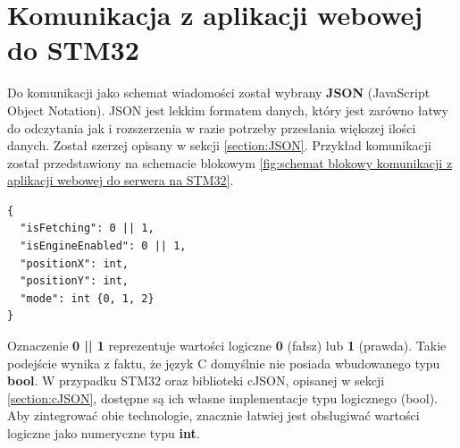 \section{Komunikacja z aplikacji webowej do STM32}
Do komunikacji jako schemat wiadomości został wybrany \textbf{JSON} (JavaScript Object Notation). JSON jest lekkim formatem danych, który jest zarówno łatwy do odczytania jak i rozszerzenia w razie potrzeby przesłania większej ilości danych. Został szerzej opisany w sekcji \ref{section:JSON}. Przykład komunikacji został przedstawiony na schemacie blokowym \ref{fig:schemat blokowy komunikacji z aplikacji webowej do serwera na STM32}.
\begin{lstlisting}[caption=Przykład struktury JSON z aplikacji webowej do STM32]
{
  "isFetching": 0 || 1,
  "isEngineEnabled": 0 || 1,
  "positionX": int,
  "positionY": int,
  "mode": int {0, 1, 2}
}
\end{lstlisting}
Oznaczenie \textbf{0 || 1} reprezentuje wartości logiczne \textbf{0} (fałsz) lub \textbf{1} (prawda). 
Takie podejście wynika z faktu, że język C domyślnie nie posiada wbudowanego typu \textbf{bool}. 
W przypadku STM32 oraz biblioteki cJSON, opisanej w sekcji \ref{section:cJSON}, dostępne są ich własne implementacje typu logicznego (bool). 
Aby zintegrować obie technologie, znacznie łatwiej jest obsługiwać wartości logiczne jako numeryczne typu \textbf{int}.
